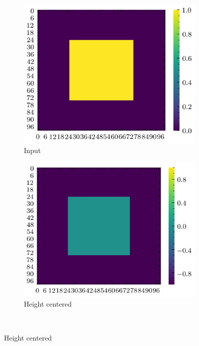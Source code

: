 \documentclass[../document.tex]{subfiles}
\begin{document}
\begin{figure}[htbp]
    \centering
    \begin{subfigure}[b]{0.32\textwidth}
        \includegraphics[width=\textwidth]{../img/data-aug/2d/square-middle.png}
        \caption{Input}
    \end{subfigure}
    \begin{subfigure}[b]{0.32\textwidth}
        \includegraphics[width=\textwidth]{../img/data-aug/2d/square-middle-center.png}
        \caption{Height centered}
    \end{subfigure}  
    \\

\end{figure}
\end{document}
